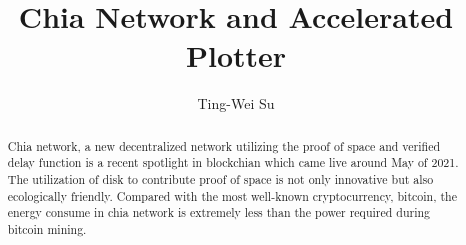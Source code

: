 \documentclass[sigconf, nonacm, natbib=false]{acmart}
\begin{document}

\author{Ting-Wei Su}

\renewcommand\footnotetextcopyrightpermission[1]{} %

\title{Chia Network and Accelerated Plotter}

\begin{abstract}
  Chia network, a new decentralized network utilizing the proof of space and verified delay function is a recent spotlight in blockchian which came live around May of 2021. The utilization of disk to contribute proof of space is not only innovative but also ecologically friendly. Compared with the most well-known cryptocurrency, bitcoin, the energy consume in chia network is extremely less than the power required during bitcoin mining. 
  

\end{abstract}
\end{document}
